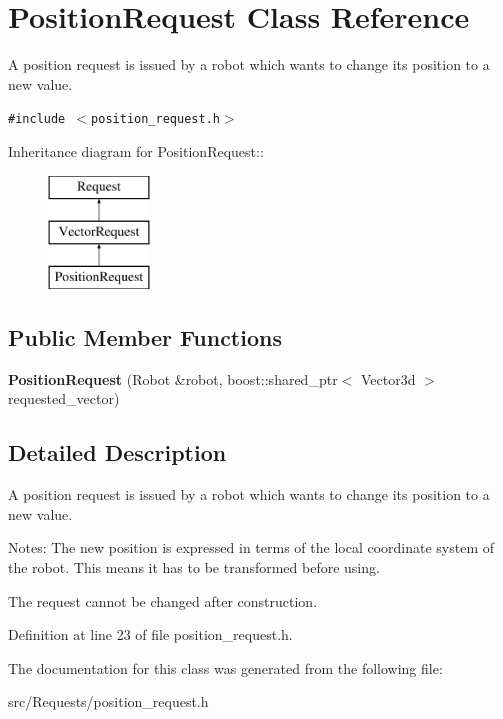 \hypertarget{class_position_request}{
\section{PositionRequest Class Reference}
\label{class_position_request}
}
A position request is issued by a robot which wants to change its position to a new value.  


{\tt \#include $<$position\_\-request.h$>$}

Inheritance diagram for PositionRequest::\begin{figure}[H]
\begin{center}
\leavevmode
\includegraphics[height=3cm]{class_position_request}
\end{center}
\end{figure}
\subsection*{Public Member Functions}
\begin{CompactItemize}
\item 
\hypertarget{class_position_request_619ce34e18b2dcae4c36c59f59671719}{
\textbf{PositionRequest} (Robot \&robot, boost::shared\_\-ptr$<$ Vector3d $>$ requested\_\-vector)}
\label{class_position_request_619ce34e18b2dcae4c36c59f59671719}

\end{CompactItemize}


\subsection{Detailed Description}
A position request is issued by a robot which wants to change its position to a new value. 

Notes: The new position is expressed in terms of the local coordinate system of the robot. This means it has to be transformed before using.

The request cannot be changed after construction. 

Definition at line 23 of file position\_\-request.h.

The documentation for this class was generated from the following file:\begin{CompactItemize}
\item 
src/Requests/position\_\-request.h\end{CompactItemize}
